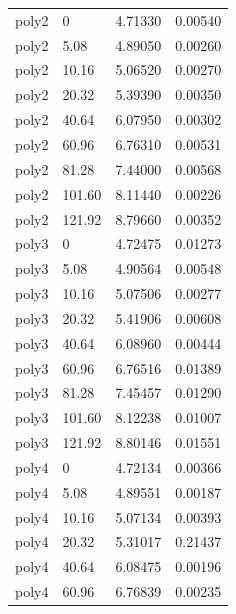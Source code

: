 \begin{onehalfspace}
\begin{longtable}{p{2.0cm} p{2.0cm} p{4.0cm} p{2.0cm} }
                poly2     & 0            & 4.71330          & 0.00540 \\
        poly2     & 5.08         & 4.89050          & 0.00260 \\
        poly2     & 10.16        & 5.06520          & 0.00270 \\
        poly2     & 20.32        & 5.39390          & 0.00350 \\
        poly2     & 40.64        & 6.07950          & 0.00302 \\
        poly2     & 60.96        & 6.76310          & 0.00531 \\
        poly2     & 81.28        & 7.44000          & 0.00568 \\
        poly2     & 101.60       & 8.11440          & 0.00226 \\
        poly2     & 121.92       & 8.79660          & 0.00352 \\
        \midrule
        poly3     & 0            & 4.72475          & 0.01273 \\
        poly3     & 5.08         & 4.90564          & 0.00548 \\
        poly3     & 10.16        & 5.07506          & 0.00277 \\
        poly3     & 20.32        & 5.41906          & 0.00608 \\
        poly3     & 40.64        & 6.08960          & 0.00444 \\
        poly3     & 60.96        & 6.76516          & 0.01389 \\
        poly3     & 81.28        & 7.45457          & 0.01290 \\
        poly3     & 101.60       & 8.12238          & 0.01007 \\
        poly3     & 121.92       & 8.80146          & 0.01551 \\
        \midrule
        poly4     & 0            & 4.72134          & 0.00366 \\
        poly4     & 5.08         & 4.89551          & 0.00187 \\
        poly4     & 10.16        & 5.07134          & 0.00393 \\
        poly4     & 20.32        & 5.31017          & 0.21437 \\
        poly4     & 40.64        & 6.08475          & 0.00196 \\
        poly4     & 60.96        & 6.76839          & 0.00235 \\

\end{longtable}
\end{onehalfspace}
